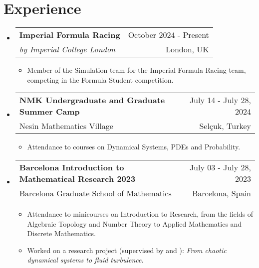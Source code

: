 \documentclass[a4paper,11pt]{article}
\makeatletter
\newcommand{\resumeQuadHeading}[4]{
  \item
  \begin{tabular*}{0.96\textwidth}[t]{l@{\extracolsep{\fill}}r}
    \textbf{#1} & \small #2 \\
    \small#3 & \small #4 \\
  \end{tabular*}
}
\newcommand{\resumeHeadingListStart}{
  \begin{itemize}[leftmargin=0.15in, label={}]
}
\newcommand{\resumeHeadingListEnd}{\end{itemize}}
\makeatother
\begin{document}
\section{Experience}
\resumeHeadingListStart{}
\resumeQuadHeading{Imperial Formula Racing}{October 2024 - Present}{\textit{by Imperial College London}}{London, UK}
\begin{itemize}[leftmargin=3em, itemsep=0.1em, topsep=2pt]
	\item \small Member of the Simulation team for the Imperial Formula Racing team, competing in the Formula Student competition.
\end{itemize}
\resumeHeadingListEnd{}

\resumeHeadingListStart{}
\resumeQuadHeading{NMK Undergraduate and Graduate Summer Camp}{July 14 - July 28, 2024}{Nesin Mathematics Village}{Selçuk, Turkey}
\begin{itemize}[leftmargin=3em, itemsep=0.1em, topsep=2pt]
	\item \small Attendance to courses on Dynamical Systems, PDEs and Probability.
\end{itemize}
\resumeHeadingListEnd{}

\resumeHeadingListStart{}
\resumeQuadHeading{Barcelona Introduction to Mathematical Research 2023}{July 03 - July 28, 2023}{Barcelona Graduate School of Mathematics}{Barcelona, Spain}
\begin{itemize}[leftmargin=3em, itemsep=0.1em, topsep=2pt]
	\item \small Attendance to minicourses on Introduction to Research, from the fields of Algebraic Topology and Number Theory to Applied Mathematics and Discrete Mathematics.
	\item \small Worked on a research project (supervised by \href{https://web.mat.upc.edu/jezabel.curbelo/}{} and \href{https://df.upc.edu/en/instabilities/people/alvaro.meseguer}{}): \emph{From chaotic dynamical systems to fluid turbulence}.
\end{itemize}
\resumeHeadingListEnd{}
\end{document}
